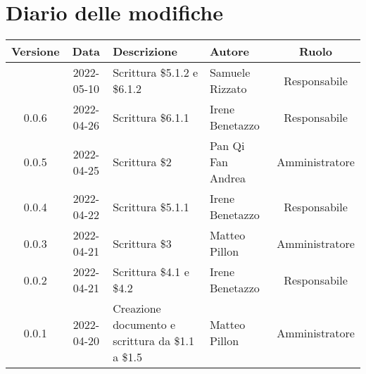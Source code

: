 \section*{Diario delle modifiche}
	\begin{center}
	\renewcommand{\arraystretch}{1.8} %
	\begin{tabular}{ |c|c|m{12em}|m{7em}|c| }
	\hline
	\textbf{Versione} & \textbf{Data} & \textbf{Descrizione} &  \textbf{Autore} &  \textbf{Ruolo} \\ %
	\hline
	 & 2022-05-10 & Scrittura \$5.1.2 e \$6.1.2 & Samuele \newline Rizzato & Responsabile\\
	\hline
	0.0.6 & 2022-04-26 & Scrittura \$6.1.1 & Irene Benetazzo & Responsabile\\
	\hline 
	0.0.5& 2022-04-25 & Scrittura \$2 & Pan Qi Fan \newline Andrea & Amministratore\\
	\hline
	0.0.4 & 2022-04-22 & Scrittura \$5.1.1 & Irene Benetazzo & Responsabile\\
	\hline 
	0.0.3 & 2022-04-21 & Scrittura \$3 & Matteo Pillon & Amministratore\\
	\hline
	0.0.2 & 2022-04-21 & Scrittura \$4.1 e \$4.2 & Irene Benetazzo & Responsabile\\
	\hline
    0.0.1 & 2022-04-20 & Creazione documento e scrittura da \$1.1 a \$1.5 & Matteo Pillon & Amministratore\\ %
	\hline
	\end{tabular}
	\end{center}
	\newpage